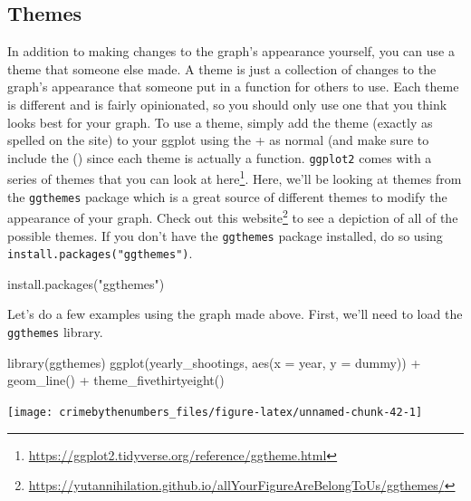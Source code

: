 \documentclass[
]{krantz}
\makeatletter
\newenvironment{Shaded}{\begin{snugshade}}{\end{snugshade}}
\newcommand{\AttributeTok}[1]{\textcolor[rgb]{0.61,0.61,0.61}{#1}}
\newcommand{\FunctionTok}[1]{\textcolor[rgb]{0,0,0}{#1}}
\newcommand{\NormalTok}[1]{#1}
\newcommand{\SpecialCharTok}[1]{\textcolor[rgb]{0,0,0}{#1}}
\newcommand{\StringTok}[1]{\textcolor[rgb]{0.5,0.5,0.5}{#1}}
\renewcommand{\href}[2]{#2\footnote{\url{#1}}}
\newenvironment{kframe}{%
\medskip{}
\setlength{\fboxsep}{.8em}
 \def\at@end@of@kframe{}%
 \ifinner\ifhmode%
  \def\at@end@of@kframe{\end{minipage}}%
  \begin{minipage}{\columnwidth}%
 \fi\fi%
 \def\FrameCommand##1{\hskip\@totalleftmargin \hskip-\fboxsep
 \colorbox{shadecolor}{##1}\hskip-\fboxsep
     \hskip-\linewidth \hskip-\@totalleftmargin \hskip\columnwidth}%
 \MakeFramed {\advance\hsize-\width
   \@totalleftmargin\z@ \linewidth\hsize
   \@setminipage}}%
 {\par\unskip\endMakeFramed%
 \at@end@of@kframe}
\renewenvironment{Shaded}{\begin{kframe}}{\end{kframe}}
\makeatother
\begin{document}
\hypertarget{themes}{%
\subsection{Themes}\label{themes}}

In addition to making changes to the graph's appearance yourself, you can use a theme that someone else made. A theme is just a collection of changes to the graph's appearance that someone put in a function for others to use. Each theme is different and is fairly opinionated, so you should only use one that you think looks best for your graph. To use a theme, simply add the theme (exactly as spelled on the site) to your ggplot using the + as normal (and make sure to include the () since each theme is actually a function. \texttt{ggplot2} comes with a series of themes that you can look at \href{https://ggplot2.tidyverse.org/reference/ggtheme.html}{here}. Here, we'll be looking at themes from the \texttt{ggthemes} package which is a great source of different themes to modify the appearance of your graph. Check out this \href{https://yutannihilation.github.io/allYourFigureAreBelongToUs/ggthemes/}{website} to see a depiction of all of the possible themes. If you don't have the \texttt{ggthemes} package installed, do so using \texttt{install.packages("ggthemes")}.

\begin{Shaded}
\begin{Highlighting}[]
\FunctionTok{install.packages}\NormalTok{(}\StringTok{"ggthemes"}\NormalTok{)}
\end{Highlighting}
\end{Shaded}

Let's do a few examples using the graph made above. First, we'll need to load the \texttt{ggthemes} library.

\begin{Shaded}
\begin{Highlighting}[]
\FunctionTok{library}\NormalTok{(ggthemes)}
\FunctionTok{ggplot}\NormalTok{(yearly\_shootings, }\FunctionTok{aes}\NormalTok{(}\AttributeTok{x =}\NormalTok{ year, }\AttributeTok{y =}\NormalTok{ dummy)) }\SpecialCharTok{+}
  \FunctionTok{geom\_line}\NormalTok{() }\SpecialCharTok{+}
  \FunctionTok{theme\_fivethirtyeight}\NormalTok{()}
\end{Highlighting}
\end{Shaded}

\begin{center}\texttt{[image: crimebythenumbers\_files/figure-latex/unnamed-chunk-42-1]} \end{center}
\end{document}
